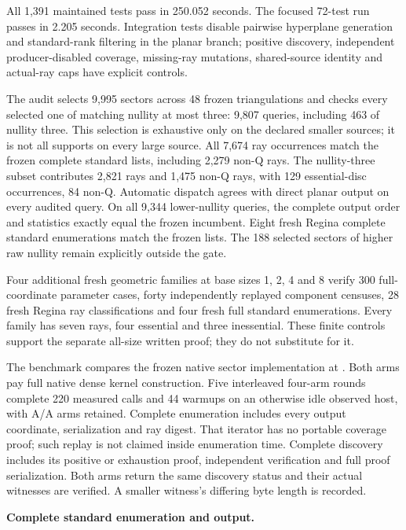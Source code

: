 All 1,391 maintained tests pass in 250.052 seconds. The focused 72-test
run passes in 2.205 seconds. Integration tests disable pairwise hyperplane
generation and standard-rank filtering in the planar branch; positive
discovery, independent producer-disabled coverage, missing-ray mutations,
shared-source identity and actual-ray caps have explicit controls.

The audit selects 9,995 sectors across 48 frozen triangulations and checks
every selected one of matching nullity at most three: 9,807 queries,
including 463 of nullity three. This selection is exhaustive only on the
declared smaller sources; it is not all supports on every large source.
All 7,674 ray occurrences match the frozen complete standard lists, including
2,279 non-Q rays. The nullity-three subset contributes 2,821 rays and
1,475 non-Q rays, with 129 essential-disc occurrences, 84 non-Q.
Automatic dispatch agrees with direct planar output on every audited
query. On all 9,344 lower-nullity queries, the complete output order and
statistics exactly equal the frozen incumbent. Eight fresh Regina complete
standard enumerations match the frozen lists. The 188 selected sectors of
higher raw nullity remain explicitly outside the gate.

Four additional fresh geometric families at base sizes 1, 2, 4 and 8
verify 300 full-coordinate parameter cases, forty independently replayed
component censuses, 28 fresh Regina ray classifications and four fresh
full standard enumerations. Every family has seven rays, four essential
and three inessential. These finite controls support the separate
all-size written proof; they do not substitute for it.

The benchmark compares the frozen native sector implementation at
. Both arms pay full native dense kernel construction.
Five interleaved four-arm rounds complete 220 measured calls and 44 warmups
on an otherwise idle observed host, with A/A arms retained. Complete
enumeration includes every output coordinate, serialization and ray digest.
That iterator has no portable coverage proof; such replay is not claimed
inside enumeration time. Complete discovery includes its positive or
exhaustion proof, independent verification and full proof serialization.
Both arms return the same discovery status and their actual witnesses are
verified. A smaller witness's differing byte length is recorded.

\begin{samepage}
\noindent\textbf{Complete standard enumeration and output.}

\end{samepage}

